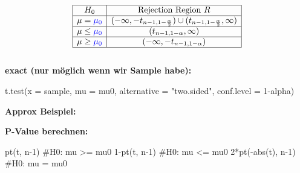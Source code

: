 \[
\begin{array}{|c|c|}
\hline
H_0 & \text{Rejection Region } R \\ \hline
\mu = \textcolor{blue}{\mu_0} & (-\infty, -t_{n-1, 1-\frac{\alpha}{2}}) \cup (t_{n-1, 1-\frac{\alpha}{2}}, \infty) \\ \hline
\mu \leq \textcolor{blue}{\mu_0} & (t_{n-1, 1-\alpha}, \infty) \\ \hline
\mu \geq \textcolor{blue}{\mu_0} & (-\infty, -t_{n-1, 1-\alpha}) \\ \hline
\end{array}
\]
\centering{}\\
\textbf{exact \textcolor{red}{\warning}(nur möglich wenn wir Sample habe)\textcolor{red}{\warning}:}
\begin{rcode}{1}
t.test(x = sample, mu = mu0, alternative = "two.sided", conf.level = 1-alpha)
\end{rcode}
\large{\textbf{Approx Beispiel:}}
\textbf{P-Value berechnen:}
\begin{rcode}{1}
pt(t, n-1) #H0: mu >= mu0
1-pt(t, n-1) #H0: mu <= mu0
2*pt(-abs(t), n-1) #H0: mu = mu0
\end{rcode}

\columnbreak